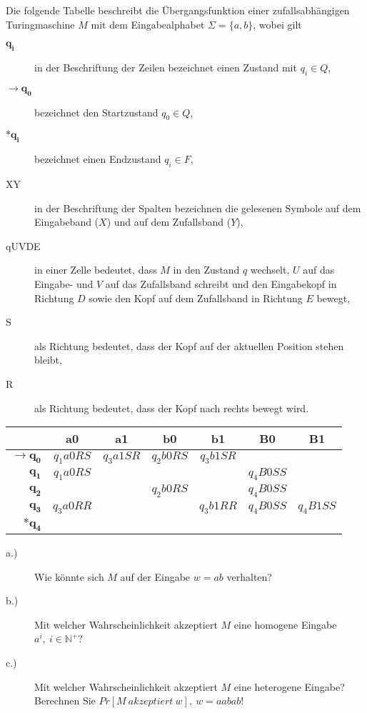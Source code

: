 Die folgende Tabelle beschreibt die Übergangsfunktion einer zufallsabhängigen Turingmaschine $M$ mit dem Eingabealphabet $\Sigma = \{a, b\}$, wobei gilt
\begin{description}
	\item [$\boldsymbol{q_i}$] in der Beschriftung der Zeilen bezeichnet einen Zustand mit $q_i \in Q$,
	\item [$\boldsymbol{\rightarrow q_0}$] bezeichnet den Startzustand $q_0 \in Q$,
	\item [$*\boldsymbol{q_i}$] bezeichnet einen Endzustand $q_i \in F$,
	\item [XY] in der Beschriftung der Spalten bezeichnen die gelesenen Symbole auf dem Eingabeband ($X$) und auf dem Zufallsband ($Y$),
	\item [qUVDE] in einer Zelle bedeutet, dass $M$ in den Zustand $q$ wechselt, $U$ auf das Eingabe- und $V$ auf das Zufallsband schreibt und den Eingabekopf in Richtung $D$ sowie den Kopf auf dem Zufallsband in Richtung $E$ bewegt,
	\item [S] als Richtung bedeutet, dass der Kopf auf der aktuellen Position stehen bleibt,
	\item [R] als Richtung bedeutet, dass der Kopf nach rechts bewegt wird.
\end{description}

\bgroup
	\def\arraystretch{1.5}
	\begin{tabular}{r || c | c | c | c | c | c}
		& \textbf{a0} & \textbf{a1} & \textbf{b0} & \textbf{b1} & \textbf{B0} & \textbf{B1} \\
		\hline \hline
		$\boldsymbol{\rightarrow q_0}$ & $q_1a0RS$ & $q_3a1SR$ & $q_2b0RS$ & $q_3b1SR$ & & \\
		\hline
		$\boldsymbol{q_1}$ & $q_1a0RS$ & & & & $q_4B0SS$ & \\
		\hline
		$\boldsymbol{q_2}$ & & & $q_2b0RS$ & & $q_4B0SS$ & \\
		\hline
		$\boldsymbol{q_3}$ & $q_3a0RR$ & & & $q_3b1RR$ & $q_4B0SS$ & $q_4B1SS$ \\
		\hline
		$\boldsymbol{*q_4}$ & & & & & & \\
	\end{tabular}
\egroup

\begin{description}
	\item [a.)] Wie könnte sich $M$ auf der Eingabe $w = ab$ verhalten?
	\item [b.)] Mit welcher Wahrscheinlichkeit akzeptiert $M$ eine homogene Eingabe $a^i,\ i \in \mathbb{N}^+$?
	\item [c.)] Mit welcher Wahrscheinlichkeit akzeptiert $M$ eine heterogene Eingabe? Berechnen Sie $Pr[M\ akzeptiert\ w],\ w = aabab$! 
\end{description}